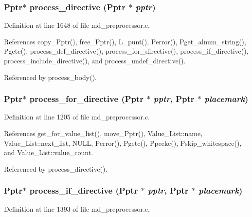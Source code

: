 \subsubsection{\setlength{\rightskip}{0pt plus 5cm}\bf{Pptr}$\ast$ process\_\-directive (\bf{Pptr} $\ast$ {\em pptr})}\label{md__preprocessor_8c_9fedc647fa9d620c00f1cf9cd84f2da4}




Definition at line 1648 of file md\_\-preprocessor.c.

References copy\_\-Pptr(), free\_\-Pptr(), L\_\-punt(), Perror(), Pget\_\-alnum\_\-string(), Pgetc(), process\_\-def\_\-directive(), process\_\-for\_\-directive(), process\_\-if\_\-directive(), process\_\-include\_\-directive(), and process\_\-undef\_\-directive().

Referenced by process\_\-body().
\subsubsection{\setlength{\rightskip}{0pt plus 5cm}\bf{Pptr}$\ast$ process\_\-for\_\-directive (\bf{Pptr} $\ast$ {\em pptr}, \bf{Pptr} $\ast$ {\em placemark})}\label{md__preprocessor_8c_79a2bf4e345e50554d0015b3fcdb30e3}




Definition at line 1205 of file md\_\-preprocessor.c.

References get\_\-for\_\-value\_\-list(), move\_\-Pptr(), Value\_\-List::name, Value\_\-List::next\_\-list, NULL, Perror(), Pgetc(), Ppeekc(), Pskip\_\-whitespace(), and Value\_\-List::value\_\-count.

Referenced by process\_\-directive().
\subsubsection{\setlength{\rightskip}{0pt plus 5cm}\bf{Pptr}$\ast$ process\_\-if\_\-directive (\bf{Pptr} $\ast$ {\em pptr}, \bf{Pptr} $\ast$ {\em placemark})}\label{md__preprocessor_8c_232036d58bb8ca96bb75ebc2d0cdf197}




Definition at line 1393 of file md\_\-preprocessor.c.

